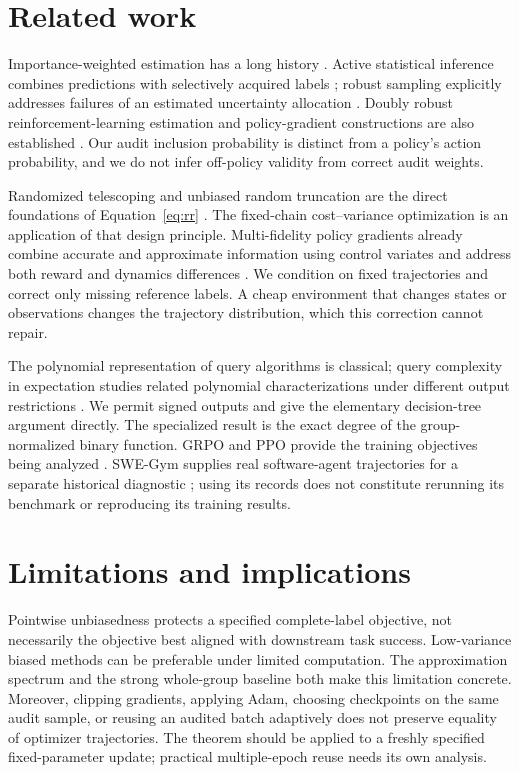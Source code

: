 \documentclass[11pt]{article}
\begin{document}


\section{Related work}\label{sec:related}
Importance-weighted estimation has a long history \citep{horvitz1952}. Active statistical inference combines predictions with selectively acquired labels \citep{zrnic2024}; robust sampling explicitly addresses failures of an estimated uncertainty allocation \citep{li2025}. Doubly robust reinforcement-learning estimation and policy-gradient constructions are also established \citep{jiang2016,huang2020}. Our audit inclusion probability is distinct from a policy's action probability, and we do not infer off-policy validity from correct audit weights.

Randomized telescoping and unbiased random truncation are the direct foundations of Equation~\eqref{eq:rr} \citep{rhee2015,beatson2019}. The fixed-chain cost--variance optimization is an application of that design principle. Multi-fidelity policy gradients already combine accurate and approximate information using control variates and address both reward and dynamics differences \citep{liu2026}. We condition on fixed trajectories and correct only missing reference labels. A cheap environment that changes states or observations changes the trajectory distribution, which this correction cannot repair.



The polynomial representation of query algorithms is classical; query complexity in expectation studies related polynomial characterizations under different output restrictions \citep{kaniewski2015}. We permit signed outputs and give the elementary decision-tree argument directly. The specialized result is the exact degree of the group-normalized binary function. GRPO and PPO provide the training objectives being analyzed \citep{shao2024,schulman2017}. SWE-Gym supplies real software-agent trajectories for a separate historical diagnostic \citep{pan2025}; using its records does not constitute rerunning its benchmark or reproducing its training results.

\section{Limitations and implications}
Pointwise unbiasedness protects a specified complete-label objective, not necessarily the objective best aligned with downstream task success. Low-variance biased methods can be preferable under limited computation. The approximation spectrum and the strong whole-group baseline both make this limitation concrete. Moreover, clipping gradients, applying Adam, choosing checkpoints on the same audit sample, or reusing an audited batch adaptively does not preserve equality of optimizer trajectories. The theorem should be applied to a freshly specified fixed-parameter update; practical multiple-epoch reuse needs its own analysis.
\end{document}
